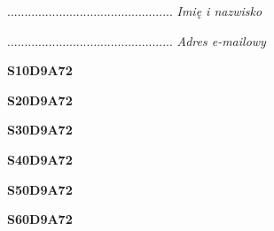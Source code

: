 \begin{turn}{90}\begin{minipage}{\linewidth} \vspace{20mm} ................................................  \textit{Imię i nazwisko}\end{minipage}\end{turn}

\begin{turn}{90}\begin{minipage}{\linewidth} \vspace{20mm} ................................................  \textit{Adres e-mailowy}\end{minipage}\end{turn}

\begin{turn}{90}\huge \begin{minipage}{\linewidth} \vspace{10mm}\textbf{S10D9A72}\end{minipage}\end{turn}

\begin{turn}{90}\huge \begin{minipage}{\linewidth} \vspace{10mm}\textbf{S20D9A72}\end{minipage}\end{turn}

\begin{turn}{90}\huge \begin{minipage}{\linewidth} \vspace{10mm}\textbf{S30D9A72}\end{minipage}\end{turn}

\begin{turn}{90}\huge \begin{minipage}{\linewidth} \vspace{10mm}\textbf{S40D9A72}\end{minipage}\end{turn}

\begin{turn}{90}\huge \begin{minipage}{\linewidth} \vspace{10mm}\textbf{S50D9A72}\end{minipage}\end{turn}

\begin{turn}{90}\huge \begin{minipage}{\linewidth} \vspace{10mm}\textbf{S60D9A72}\end{minipage}\end{turn}

